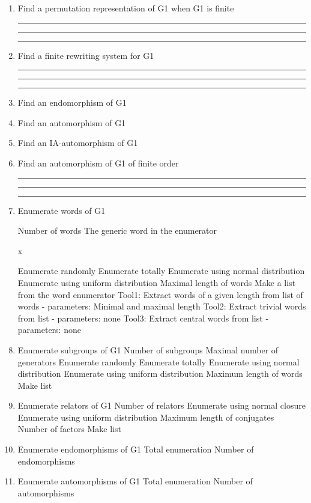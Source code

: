 \begin{enumerate}
\item Find a permutation representation of G1 when G1 is finite

\bigskip
\hrule\hrule\hrule
\item Find a finite rewriting system for G1

\bigskip
\hrule\hrule\hrule

\item Find an endomorphism of G1

\item Find an automorphism of G1

\item Find an IA-automorphism of G1

\item Find an automorphism of G1 of finite order

\bigskip
\hrule\hrule\hrule
\item Enumerate words of G1

\subitem Number of words
\subsubitem The generic word in the enumerator

\hskip 2.0in    x

\subsubitem Enumerate randomly
\subsubitem Enumerate totally
\subsubitem Enumerate using normal distribution
\subsubitem Enumerate using uniform distribution
\subsubitem Maximal length of words
\bigskip
\subitem Make a list from the word enumerator
\subsubitem Tool1: Extract words of a given length
from list of words - parameters: Minimal and maximal length
\subsubitem Tool2: Extract trivial words from list - parameters: none
\subsubitem Tool3: Extract central words from list - parameters: none
\bigskip
\item Enumerate subgroups of G1
\subitem Number of subgroups
\subitem Maximal number of generators
\subsubitem Enumerate randomly
\subsubitem Enumerate totally
\subsubitem Enumerate using normal distribution
\subsubitem Enumerate using uniform distribution
\subsubitem Maximum length of words
\bigskip
\subitem Make list
\bigskip
\item Enumerate relators of G1
\subitem Number of relators
\subsubitem Enumerate using normal closure
\subsubitem Enumerate using uniform distribution
\subsubitem Maximum length of conjugates
\subsubitem Number of factors
\subitem Make list

\bigskip
\item Enumerate endomorphisms of G1
\subitem Total enumeration
\subsubitem Number of endomorphisms

 \bigskip
\item Enumerate automorphisms of G1
\subitem Total enumeration
\subsubitem Number of automorphisms


\end{enumerate}
